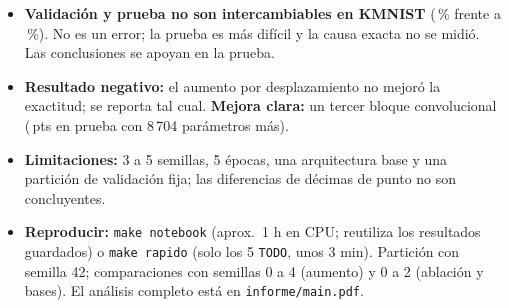 \documentclass[11pt,letterpaper]{article}
\newcommand{\pts}{\,pts}
\begin{document}
\begin{itemize}
  \item \textbf{Validación y prueba no son intercambiables en KMNIST} (\cifraaccVal\,\% frente a \cifraaccTest\,\%). No es un error; la prueba es más difícil y la causa exacta no se midió. Las conclusiones se apoyan en la prueba.
  \item \textbf{Resultado negativo:} el aumento por desplazamiento no mejoró la exactitud; se reporta tal cual. \textbf{Mejora clara:} un tercer bloque convolucional (\cifraablTresTe\pts{} en prueba con 8\,704 parámetros más).
  \item \textbf{Limitaciones:} 3 a 5 semillas, 5 épocas, una arquitectura base y una partición de validación fija; las diferencias de décimas de punto no son concluyentes.
  \item \textbf{Reproducir:} \texttt{make notebook} (aprox.\ 1 h en CPU; reutiliza los resultados guardados) o \texttt{make rapido} (solo los 5 \texttt{TODO}, unos 3 min). Partición con semilla 42; comparaciones con semillas 0 a 4
        (aumento) y 0 a 2 (ablación y bases). El análisis completo está en \texttt{informe/main.pdf}.
\end{itemize}
\end{document}
